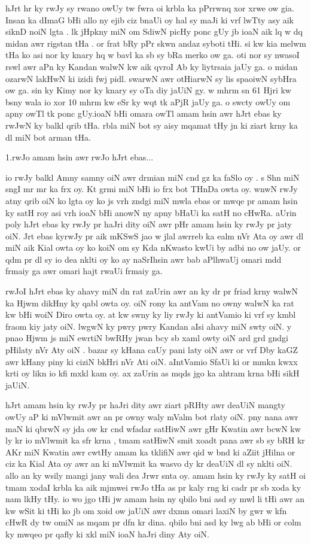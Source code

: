 \documentclass[a4paper]{article}
\begin{document}
hJrt hr ky rwJy sy rwano owUy tw fwra oi krbla ka pPrrwnq xor xrwe ow gia.
Insan ka dImaG bHi allo ny ejib ciz bnaUi oy hal sy maJi ki vrf lwTty asy aik siknD noiN lgta .
lk jHpkny miN om SdiwN picHy ponc  gUy jb ioaN aik lq w dq midan awr rigstan tHa .
or frat bRy pPr skwn andaz syboti tHi.
si kw kia melwm tHa ko asi nor ky knary hq w bavl ka sb sy bRa merko ow ga.
oti nor sy nwasoI rswl awr aPn ky Kandan  walwN kw aik qvroI Ab ky liytrsaia jaUy ga.
o midan ozarwN lakHwN ki izidi fwj pidl.
swarwN awr otHiarwN sy lis spaoiwN sybHra ow ga.
sin ky Kimy nor ky knary sy oTa diy jaUiN gy.
w mhrm sn 61 Hjri kw bsny wala io xor 10 mhrm kw eSr ky wqt tk aPjR jaUy ga.
o swcty owUy om apny owTl tk ponc gUy.ioaN bHi omara owTl amam hsin awr hJrt ebas ky rwJwN ky balkl qrib tHa.
rbla miN bot sy aisy mqamat tHy jn ki ziart krny ka dl miN bot arman tHa.

1.rwJo amam hsin awr rwJo hJrt ebas...

io rwJy balkl Amny samny oiN awr drmian miN cnd gz ka faSlo oy .
s Shn miN sngI mr mr ka frx oy.
Kt grmi miN bHi io frx bot THnDa owta oy.
wnwN rwJy atny qrib oiN ko lgta oy ko js vrh zndgi miN mwla ebas or mwqe pr  amam hsin ky satH roy asi vrh ioaN bHi anowN ny apny bHaUi ka satH no cHwRa.
aUrin poly hJrt ebas ky rwJy pr haJri dity  oiN awr pHr amam hsin ky rwJy pr jaty oiN.
Jrt ebas kyrwJy pr aik mKSwS jao w jlal awrreb ka ealm nVr Ata oy awr dl miN aik Kial owta oy ko koiN om sy Kda nKwasto kwUi by adbi no ow jaUy.
or qdm pr dl sy io dea nklti oy ko ay naSrIhsin awr bab aPlhwaUj omari mdd frmaiy ga awr omari hajt rwaUi frmaiy ga.

rwJoI  hJrt ebas ky ahavy miN dn rat zaUrin awr an ky dr pr friad krny walwN ka Hjwm dikHny ky qabl owta oy.
oiN rony ka antVam no owny walwN ka rat kw bHi woiN Diro owta oy.
at  kw swny ky liy rwJy ki antVamio ki vrf sy kmbl fraom kiy jaty oiN.
lwgwN ky pwry pwry Kandan aIsi ahavy miN swty oiN.
y pnao Hjwm js miN ewrtiN bwRHy jwan bcy sb xaml owty oiN ard grd  gndgi pHilaty nVr Aty oiN .
bazar sy kHana  caUy pani laty oiN awr or vrf Dby kaGZ awr kHany  piny ki ciziN bkHri nVr Ati oiN.
aIntVamio SfaUi ki or mmkn kwxx krti oy likn io kfi mxkl kam oy.
ax zaUrin as mqds jgo ka ahtram krna bHi sikH jaUiN.

hJrt amam hsin ky rwJy pr haJri dity awr ziart pRHty awr deaUiN mangty owUy aP ki mVlwmit awr an pr owny waly mValm bot rlaty oiN.
pny nana awr maN ki qbrwN sy jda ow kr cnd wfadar satHiwN awr gHr Kwatin awr bcwN kw ly kr  io mVlwmit ka sfr krna  , tmam satHiwN smit xoadt pana awr sb sy bRH kr  AKr miN Kwatin awr cwtHy amam ka tklifiN awr qid w bnd ki aZiit jHilna or ciz ka Kial Ata oy awr an ki mVlwmit ka wasvo dy kr deaUiN dl sy nklti oiN.
allo an ky wsily mangi jany wali dea Jrwr snta oy.
amam hsin ky rwJy ky satH oi tmam xodaI krbla ka aik mjmwei rwJo tHa as pr kaly rng ki cadr pr sb xoda ky nam lkHy tHy.
io wo jgo tHi jw amam hsin ny qbilo bni asd sy mwl li tHi awr an kw wSit ki tHi ko jb om xoid ow jaUiN awr dxmn omari laxiN by gwr w kfn cHwR dy tw omiN as mqam pr dfn kr dina.
qbilo bni asd ky lwg ab bHi or colm ky mwqeo pr qafly ki xkl miN ioaN haJri  diny Aty oiN.
\end{document}
